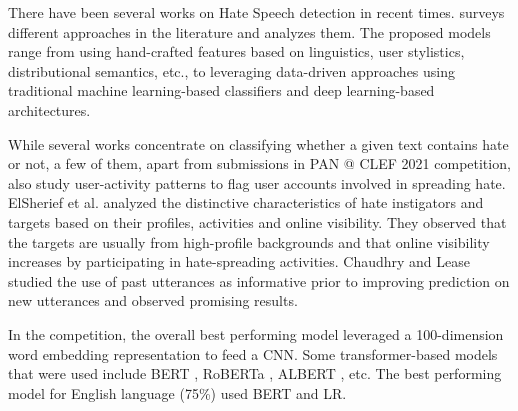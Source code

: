 
There have been several works on Hate Speech detection in recent times. \cite{methodsSurvey} surveys different approaches in the literature and analyzes them. The proposed models range from using hand-crafted features based on linguistics, user stylistics, distributional semantics, etc., to leveraging data-driven approaches using traditional machine learning-based classifiers and deep learning-based architectures. 

While several works concentrate on classifying whether a given text contains hate or not, a few of them, apart from submissions in PAN @ CLEF 2021 competition, also study user-activity patterns to flag user accounts involved in spreading hate. ElSherief et al. \cite{ElSherief} analyzed the distinctive characteristics of hate instigators and targets based on their profiles, activities and online visibility. They observed that the targets are usually from high-profile backgrounds and that online visibility increases by participating in hate-spreading activities. Chaudhry and Lease \cite{DBLP:Chaudhry} studied the use of past utterances as informative prior to improving prediction on new utterances and observed promising results.


In the competition, the overall best performing model \cite{overall_best} leveraged a 100-dimension word embedding representation to feed a \ac{CNN}. Some transformer-based models that were used include \ac{BERT} \cite{bert}, \ac{RoBERTa} \cite{roberta}, \ac{ALBERT} \cite{albert}, etc. The best performing model \cite{english_best} for English language (75\%) used \ac{BERT} and \ac{LR}.



